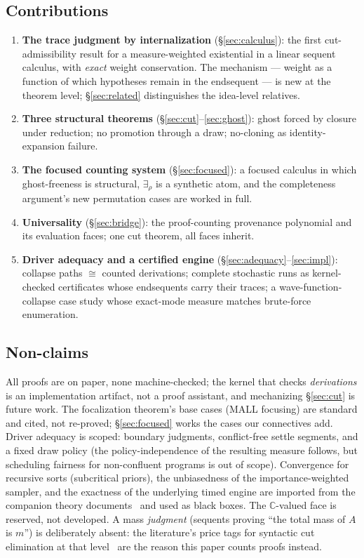 \documentclass[11pt]{article}
\newcommand{\CC}{\mathbb{C}}                     %
\theoremstyle{definition}
\theoremstyle{remark}
\begin{document}
\subsection{Contributions}

\begin{enumerate}
\item \textbf{The trace judgment by internalization}
  (\S\ref{sec:calculus}): the first cut-admissibility result for a
  measure-weighted existential in a linear sequent calculus, with
  \emph{exact} weight conservation.  The mechanism --- weight as a
  function of which hypotheses remain in the endsequent --- is new at
  the theorem level; \S\ref{sec:related} distinguishes the idea-level
  relatives.
\item \textbf{Three structural theorems} (\S\ref{sec:cut}--\ref{sec:ghost}):
  ghost forced by closure under reduction; no promotion through a draw;
  no-cloning as identity-expansion failure.
\item \textbf{The focused counting system} (\S\ref{sec:focused}): a
  focused calculus in which ghost-freeness is structural, $\exists_\rho$
  is a synthetic atom, and the completeness argument's new permutation
  cases are worked in full.
\item \textbf{Universality} (\S\ref{sec:bridge}): the proof-counting
  provenance polynomial and its evaluation faces; one cut theorem, all
  faces inherit.
\item \textbf{Driver adequacy and a certified engine}
  (\S\ref{sec:adequacy}--\ref{sec:impl}): collapse paths $\cong$
  counted derivations; complete stochastic runs as kernel-checked
  certificates whose endsequents carry their traces; a
  wave-function-collapse case study whose exact-mode measure matches
  brute-force enumeration.
\end{enumerate}

\subsection{Non-claims}

All proofs are on paper, none machine-checked; the kernel that checks
\emph{derivations} is an implementation artifact, not a proof
assistant, and mechanizing \S\ref{sec:cut} is future work.  The
focalization theorem's base cases (MALL focusing) are standard and
cited, not re-proved; \S\ref{sec:focused} works the cases our
connectives add.  Driver adequacy is scoped: boundary judgments,
conflict-free settle segments, and a fixed draw policy (the
policy-independence of the resulting measure follows, but scheduling
fairness for non-confluent programs is out of scope).  Convergence for
recursive sorts (subcritical priors), the unbiasedness of the
importance-weighted sampler, and the exactness of the underlying timed
engine are imported from the companion theory
documents~\cite{THY0026,TillPaper} and used as black boxes.  The
$\CC$-valued face is reserved, not developed.  A mass \emph{judgment}
(sequents proving ``the total mass of $A$ is $m$'') is deliberately
absent: the literature's price tags for syntactic cut elimination at
that level~\cite{LucasMio2022,AntonelliDLP2022} are the reason this
paper counts proofs instead.
\end{document}

